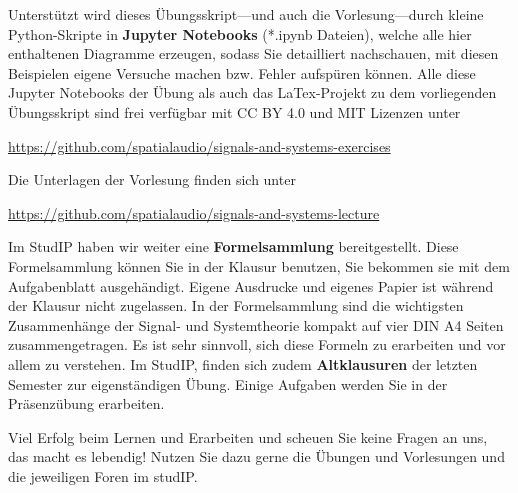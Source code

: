Unterstützt wird dieses Übungsskript---und auch die Vorlesung---durch kleine Python-Skripte in
\textbf{Jupyter Notebooks} (*.ipynb Dateien),
welche alle hier enthaltenen Diagramme erzeugen, sodass Sie
detailliert nachschauen, mit diesen Beispielen eigene Versuche machen
bzw. Fehler aufspüren können.
%
Alle diese Jupyter Notebooks der Übung als auch das LaTex-Projekt zu dem vorliegenden Übungsskript sind frei verfügbar mit CC BY 4.0 und MIT Lizenzen unter
\begin{mdframed}[backgroundcolor=C2!10]
\url{https://github.com/spatialaudio/signals-and-systems-exercises}
\end{mdframed}
%
Die Unterlagen der Vorlesung finden sich unter
\begin{mdframed}[backgroundcolor=C2!10]
\url{https://github.com/spatialaudio/signals-and-systems-lecture}
\end{mdframed}


Im StudIP haben wir weiter eine \textbf{Formelsammlung} bereitgestellt.
%
Diese Formelsammlung können Sie in der Klausur benutzen, Sie bekommen sie
mit dem Aufgabenblatt ausgehändigt.
%
Eigene Ausdrucke und eigenes Papier ist während der Klausur nicht zugelassen.
%
In der Formelsammlung sind die wichtigsten Zusammenhänge der Signal- und
Systemtheorie kompakt auf vier DIN A4 Seiten zusammengetragen.
%
Es ist sehr sinnvoll, sich diese Formeln zu erarbeiten und vor allem zu verstehen.
%
Im StudIP, finden sich zudem \textbf{Altklausuren} der letzten Semester zur eigenständigen Übung. Einige Aufgaben werden Sie in der Präsenzübung erarbeiten.

Viel Erfolg beim Lernen und Erarbeiten und scheuen Sie keine Fragen an uns, das macht es lebendig!
Nutzen Sie dazu gerne die Übungen und Vorlesungen und die
jeweiligen Foren im studIP.


\newpage
